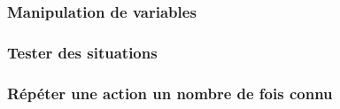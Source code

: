 \subsubsection{Manipulation de variables}
    \vspace{-0.75em}
    

\subsubsection{Tester des situations}
    \vspace{-0.75em}
    

\subsubsection{Répéter une action un nombre de fois \og connu \fg}
    \vspace{-0.75em}
    
